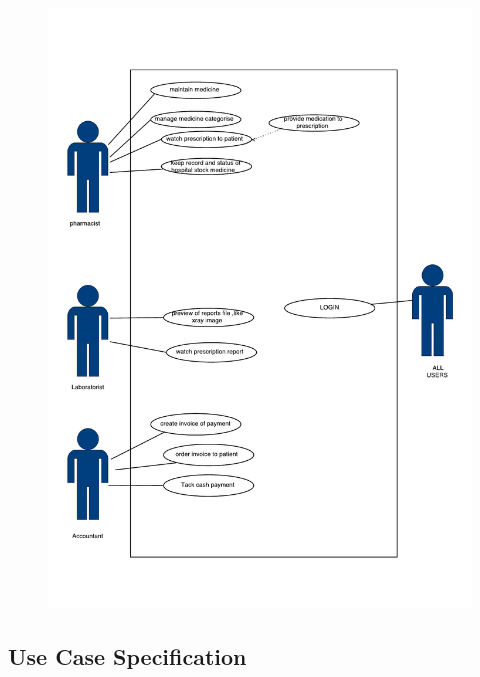 \documentclass[14pt]{article}
\begin{document}
\begin{figure}[h!]
\centering
  \includegraphics[width=14.5cm]{hospitalDiagram-2.pdf}
\end{figure}
\newpage 
\subsection{Use Case Specification}
\end{document}

